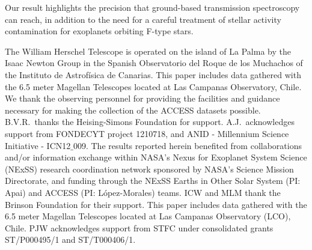 \documentclass[twocolumn]{aastex63}
\begin{document}
Our result highlights the precision that ground-based transmission spectroscopy can reach, in addition to the need for a careful treatment of stellar activity contamination for exoplanets orbiting F-type stars. 




\acknowledgments

The William Herschel Telescope is operated on the island of La Palma by the Isaac Newton Group in the Spanish Observatorio del Roque de los Muchachos of the Instituto de Astrof\'{i}sica de Canarias. This paper includes data gathered with the 6.5 meter Magellan Telescopes located at Las Campanas Observatory, Chile. We thank the observing personnel for providing the facilities and guidance necessary for making the collection of the ACCESS datasets possible. B.V.R.\ thanks the Heising-Simons Foundation for support. A.J.\ acknowledges support from FONDECYT project 1210718, and ANID - Millennium Science Initiative - ICN12$\_$009. The results reported herein benefited from collaborations and/or information exchange within NASA's Nexus for Exoplanet System Science (NExSS) research coordination network sponsored by NASA's Science Mission Directorate, and funding through the NExSS Earths in Other Solar System (PI: Apai) and ACCESS (PI: L\'opez-Morales) teams. ICW and MLM thank the Brinson Foundation for their support. This paper includes data gathered with the 6.5 meter Magellan Telescopes located at Las Campanas Observatory (LCO), Chile. PJW acknowledges support from STFC under consolidated grants ST/P000495/1 and ST/T000406/1.


%

\vspace{5mm}

\end{document}
